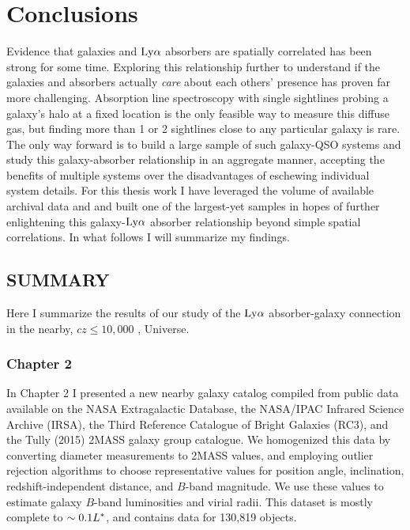 \chapter[Conclusions]{Conclusions}
\label{chap:conclusions}


\clearpage

Evidence that galaxies and $\rm Ly\alpha$ absorbers are spatially correlated has been strong for some time. Exploring this relationship further to understand if the galaxies and absorbers actually \emph{care} about each others' presence has proven far more challenging. Absorption line spectroscopy with single sightlines probing a galaxy's halo at a fixed location is the only feasible way to measure this diffuse gas, but finding more than 1 or 2 sightlines close to any particular galaxy is rare. The only way forward is to build a large sample of such galaxy-QSO systems and study this galaxy-absorber relationship in an aggregate manner, accepting the benefits of multiple systems over the disadvantages of eschewing individual system details. For this thesis work I have leveraged the volume of available archival data and and built one of the largest-yet samples in hopes of further enlightening this galaxy-$\rm Ly\alpha$ absorber relationship beyond simple spatial correlations. In what follows I will summarize my findings.

\section{SUMMARY}
Here I summarize the results of our study of the $\rm Ly\alpha$ absorber-galaxy connection in the nearby, $cz \leq 10,000$ \kms, Universe.

\subsection{Chapter 2}
In Chapter 2 I presented a new nearby galaxy catalog compiled from public data available on the NASA Extragalactic Database, the NASA/IPAC Infrared Science Archive (IRSA), the Third Reference Catalogue of Bright Galaxies (RC3), and the Tully (2015) 2MASS galaxy group catalogue. We homogenized this data by converting diameter measurements to 2MASS values, and employing outlier rejection algorithms to choose representative values for position angle, inclination, redshift-independent distance, and $B$-band magnitude. We use these values to estimate galaxy $B$-band luminosities and virial radii. This dataset is mostly complete to $\sim 0.1 L^{\**}$, and contains data for 130,819 objects.

